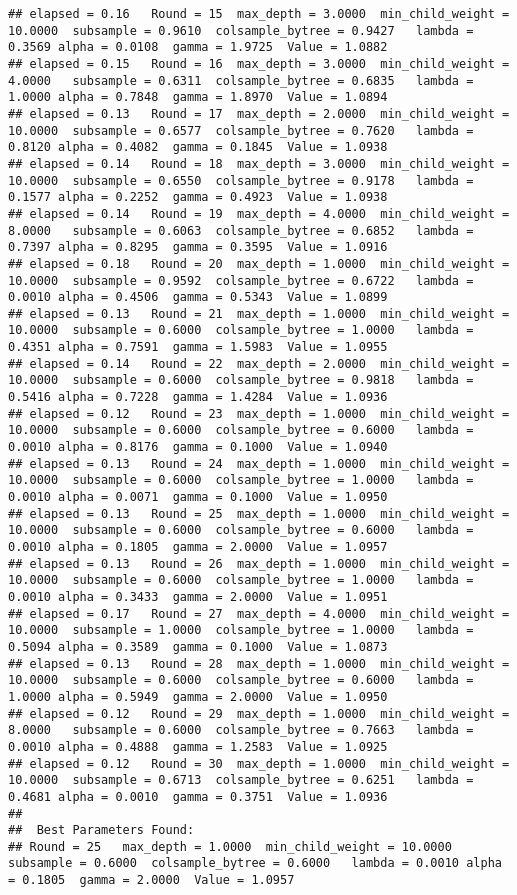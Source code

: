 \documentclass[]{article}
\begin{document}
\begin{verbatim}
## elapsed = 0.16   Round = 15  max_depth = 3.0000  min_child_weight = 10.0000  subsample = 0.9610  colsample_bytree = 0.9427   lambda = 0.3569 alpha = 0.0108  gamma = 1.9725  Value = 1.0882 
## elapsed = 0.15   Round = 16  max_depth = 3.0000  min_child_weight = 4.0000   subsample = 0.6311  colsample_bytree = 0.6835   lambda = 1.0000 alpha = 0.7848  gamma = 1.8970  Value = 1.0894 
## elapsed = 0.13   Round = 17  max_depth = 2.0000  min_child_weight = 10.0000  subsample = 0.6577  colsample_bytree = 0.7620   lambda = 0.8120 alpha = 0.4082  gamma = 0.1845  Value = 1.0938 
## elapsed = 0.14   Round = 18  max_depth = 3.0000  min_child_weight = 10.0000  subsample = 0.6550  colsample_bytree = 0.9178   lambda = 0.1577 alpha = 0.2252  gamma = 0.4923  Value = 1.0938 
## elapsed = 0.14   Round = 19  max_depth = 4.0000  min_child_weight = 8.0000   subsample = 0.6063  colsample_bytree = 0.6852   lambda = 0.7397 alpha = 0.8295  gamma = 0.3595  Value = 1.0916 
## elapsed = 0.18   Round = 20  max_depth = 1.0000  min_child_weight = 10.0000  subsample = 0.9592  colsample_bytree = 0.6722   lambda = 0.0010 alpha = 0.4506  gamma = 0.5343  Value = 1.0899 
## elapsed = 0.13   Round = 21  max_depth = 1.0000  min_child_weight = 10.0000  subsample = 0.6000  colsample_bytree = 1.0000   lambda = 0.4351 alpha = 0.7591  gamma = 1.5983  Value = 1.0955 
## elapsed = 0.14   Round = 22  max_depth = 2.0000  min_child_weight = 10.0000  subsample = 0.6000  colsample_bytree = 0.9818   lambda = 0.5416 alpha = 0.7228  gamma = 1.4284  Value = 1.0936 
## elapsed = 0.12   Round = 23  max_depth = 1.0000  min_child_weight = 10.0000  subsample = 0.6000  colsample_bytree = 0.6000   lambda = 0.0010 alpha = 0.8176  gamma = 0.1000  Value = 1.0940 
## elapsed = 0.13   Round = 24  max_depth = 1.0000  min_child_weight = 10.0000  subsample = 0.6000  colsample_bytree = 1.0000   lambda = 0.0010 alpha = 0.0071  gamma = 0.1000  Value = 1.0950 
## elapsed = 0.13   Round = 25  max_depth = 1.0000  min_child_weight = 10.0000  subsample = 0.6000  colsample_bytree = 0.6000   lambda = 0.0010 alpha = 0.1805  gamma = 2.0000  Value = 1.0957 
## elapsed = 0.13   Round = 26  max_depth = 1.0000  min_child_weight = 10.0000  subsample = 0.6000  colsample_bytree = 1.0000   lambda = 0.0010 alpha = 0.3433  gamma = 2.0000  Value = 1.0951 
## elapsed = 0.17   Round = 27  max_depth = 4.0000  min_child_weight = 10.0000  subsample = 1.0000  colsample_bytree = 1.0000   lambda = 0.5094 alpha = 0.3589  gamma = 0.1000  Value = 1.0873 
## elapsed = 0.13   Round = 28  max_depth = 1.0000  min_child_weight = 10.0000  subsample = 0.6000  colsample_bytree = 0.6000   lambda = 1.0000 alpha = 0.5949  gamma = 2.0000  Value = 1.0950 
## elapsed = 0.12   Round = 29  max_depth = 1.0000  min_child_weight = 8.0000   subsample = 0.6000  colsample_bytree = 0.7663   lambda = 0.0010 alpha = 0.4888  gamma = 1.2583  Value = 1.0925 
## elapsed = 0.12   Round = 30  max_depth = 1.0000  min_child_weight = 10.0000  subsample = 0.6713  colsample_bytree = 0.6251   lambda = 0.4681 alpha = 0.0010  gamma = 0.3751  Value = 1.0936 
## 
##  Best Parameters Found: 
## Round = 25   max_depth = 1.0000  min_child_weight = 10.0000  subsample = 0.6000  colsample_bytree = 0.6000   lambda = 0.0010 alpha = 0.1805  gamma = 2.0000  Value = 1.0957
\end{verbatim}
\end{document}
